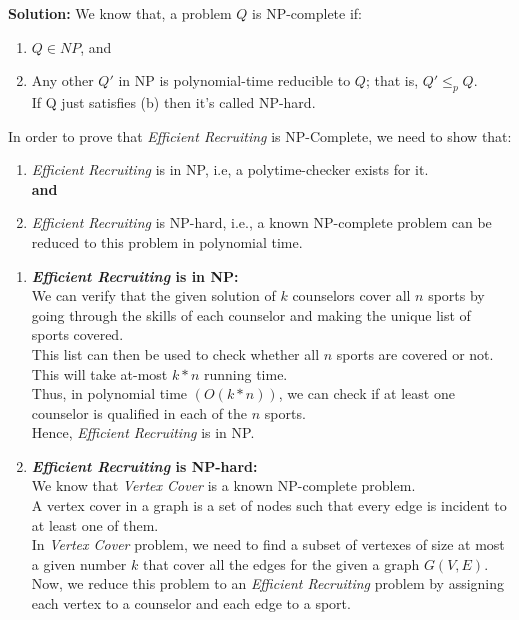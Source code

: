 \documentclass[12pt]{article}
\begin{document}
\begin{enumerate}
\begin{itemize}
\end{itemize}
\textbf{Solution:} We know that, a problem $Q$ is NP-complete if: 
\begin{enumerate}
\item $Q \in NP$, and 
\item Any other $Q'$ in NP is polynomial-time reducible to $Q$; that is, $Q' \le_{p} Q$.\\
If Q just satisfies (b) then it’s called NP-hard.	
\end{enumerate} 
In order to prove that \textit{Efficient Recruiting} is NP-Complete, we need to show that:
\begin{enumerate}
\item \textit{Efficient Recruiting} is in NP, i.e, a polytime-checker exists for it.\\
\textbf{and}
\item \textit{Efficient Recruiting} is NP-hard, i.e., a known NP-complete problem can be reduced to this problem in polynomial time.
\end{enumerate}
\begin{enumerate}
\item \textbf{\textit{Efficient Recruiting} is in NP:}\\
We can verify that the given solution of $k$ counselors cover all $n$ sports by going through the skills of each counselor and making the unique list of sports covered. \\
This list can then be used to check whether all $n$ sports are covered or not.\\
This will take at-most $k*n$ running time.\\
Thus, in polynomial time $(O(k*n))$, we can check if at least one counselor is qualified in each of the $n$ sports.\\
Hence, \textit{Efficient Recruiting} is in NP.
\item \textbf{\textit{Efficient Recruiting} is NP-hard:}\\
We know that \textit{Vertex Cover} is a known NP-complete problem.\\
A vertex cover in a graph is a set of nodes such that every edge is incident to at least one of them.\\
In \textit{Vertex Cover} problem, we need to find a subset of vertexes of size at most a given number $k$ that cover all the edges for the given a graph $G(V,E).$\\
Now, we reduce this problem to an \textit{Efficient Recruiting} problem by assigning each vertex to a counselor and each edge to a sport.\\

\end{enumerate}
\end{enumerate}
\end{document}
